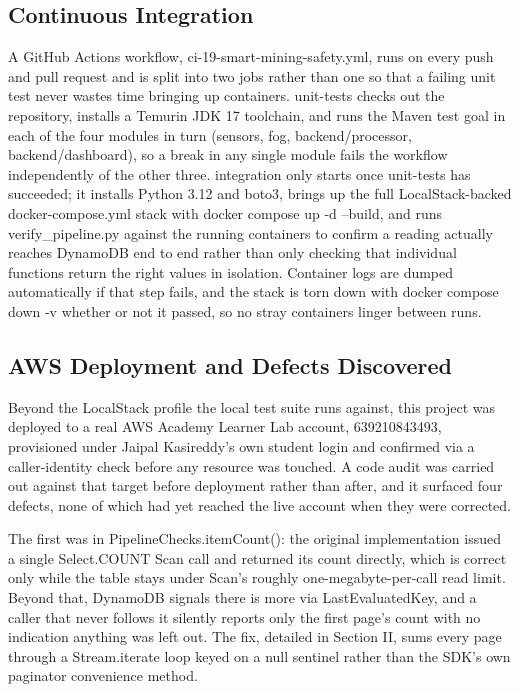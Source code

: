 \documentclass[conference]{IEEEtran}
\begin{document}
\subsection{Continuous Integration}

A GitHub Actions workflow, ci-19-smart-mining-safety.yml, runs on every push and pull request and is split into two jobs rather than one so that a failing unit test never wastes time bringing up containers. unit-tests checks out the repository, installs a Temurin JDK 17 toolchain, and runs the Maven test goal in each of the four modules in turn (sensors, fog, backend/processor, backend/dashboard), so a break in any single module fails the workflow independently of the other three. integration only starts once unit-tests has succeeded; it installs Python 3.12 and boto3, brings up the full LocalStack-backed docker-compose.yml stack with docker compose up -d --build, and runs verify\_pipeline.py against the running containers to confirm a reading actually reaches DynamoDB end to end rather than only checking that individual functions return the right values in isolation. Container logs are dumped automatically if that step fails, and the stack is torn down with docker compose down -v whether or not it passed, so no stray containers linger between runs.

\subsection{AWS Deployment and Defects Discovered}

Beyond the LocalStack profile the local test suite runs against, this project was deployed to a real AWS Academy Learner Lab account, 639210843493, provisioned under Jaipal Kasireddy's own student login and confirmed via a caller-identity check before any resource was touched. A code audit was carried out against that target before deployment rather than after, and it surfaced four defects, none of which had yet reached the live account when they were corrected.

The first was in PipelineChecks.itemCount(): the original implementation issued a single Select.COUNT Scan call and returned its count directly, which is correct only while the table stays under Scan's roughly one-megabyte-per-call read limit. Beyond that, DynamoDB signals there is more via LastEvaluatedKey, and a caller that never follows it silently reports only the first page's count with no indication anything was left out. The fix, detailed in Section II, sums every page through a Stream.iterate loop keyed on a null sentinel rather than the SDK's own paginator convenience method.
\end{document}
